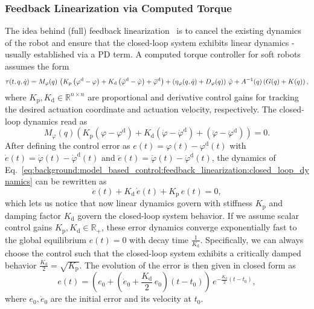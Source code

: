 \subsubsection{Feedback Linearization via Computed Torque}
The idea behind (full) feedback linearization~\citep{slotine1987on, spong2020robot} is to 
cancel the existing dynamics of the robot and ensure that the closed-loop system exhibits linear dynamics - usually established via a PD term. A computed torque controller for soft robots assumes the form
\begin{equation}\small
    \tau(t,q,\dot{q}) = M_{\varphi}(q) \, \left (K_\mathrm{p} \left (\varphi^\mathrm{d} - \varphi \right ) + K_\mathrm{d} \left (\dot{\varphi}^\mathrm{d} - \dot{\varphi} \right ) + \ddot{\varphi}^\mathrm{d}\right ) + \left ( \eta_{\varphi}(q,\dot{q}) + D_\varphi(q) \right ) \, \dot{\varphi} + A^{-1}(q) \left ( G(q) + K(q) \right ),
\end{equation}
where $K_\mathrm{p}, K_\mathrm{d} \in \mathbb{R}^{n \times n}$ are proportional and derivative control gains for tracking the desired actuation coordinate and actuation velocity, respectively. 
The closed-loop dynamics read as
\begin{equation}\label{eq:background:model_based_control:feedback_linearization:closed_loop_dynamics}
    M_{\varphi}(q) \left (K_\mathrm{p} \left (\varphi - \varphi^\mathrm{d} \right ) + K_\mathrm{d} \left (\dot{\varphi} - \dot{\varphi}^\mathrm{d} \right ) + \left ( \ddot{\varphi} - \ddot{\varphi}^\mathrm{d} \right ) \right ) = 0.
\end{equation}
After defining the control error as $e(t) = \varphi(t) - \varphi^\mathrm{d}(t)$ with $\dot{e}(t) = \dot{\varphi}(t) - \dot{\varphi}^\mathrm{d}(t)$ and $\ddot{e}(t) = \ddot{\varphi}(t) - \ddot{\varphi}^\mathrm{d}(t)$, the dynamics of Eq.~\ref{eq:background:model_based_control:feedback_linearization:closed_loop_dynamics} can be rewritten as
\begin{equation}
    \ddot{e}(t) + K_\mathrm{d} \, \dot{e}(t) + K_\mathrm{p} \, e(t) = 0,
\end{equation}
which lets us notice that now linear dynamics govern with stiffness $K_\mathrm{p}$ and damping factor $K_\mathrm{d}$ govern the closed-loop system behavior.
If we assume scalar control gains $K_\mathrm{p}, K_\mathrm{d} \in \mathbb{R}_+$, these error dynamics converge exponentially fast to the global equilibrium $e(t) = 0$ with decay time $\frac{1}{K_\mathrm{d}}$. Specifically, we can always choose the control such that the closed-loop system exhibits a critically damped behavior $\frac{K_\mathrm{d}}{2} = \sqrt{K_\mathrm{p}}$.
The evolution of the error is then given in closed form as
\begin{equation}\label{eq:background:model_based_control:feedback_linearization:error_evolution_closed_form}
    e(t) = \left ( e_0 + \left ( \dot{e}_0 + \frac{K_\mathrm{d}}{2} \, e_0 \right ) (t-t_0) \right ) \, e^{-\frac{K_\mathrm{d}}{2} (t - t_0)},
\end{equation}
where $e_0, \dot{e}_0$ are the initial error and its velocity at $t_0$.

